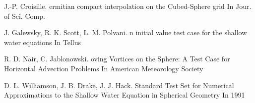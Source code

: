 \documentclass[portrait,final,a0paper,fontscale=0.277]{baposter}
\begin{document}
\begin{poster}
{\begin{thebibliography}{1}
        J.-P. Croisille.
        ermitian compact interpolation on the Cubed-Sphere grid
        \newblock In {Jour. of Sci. Comp.}
        
        J. Galewsky, R. K. Scott, L. M. Polvani.
        n initial value test case for the shallow water equations
        \newblock In {Tellus}
        
        R. D. Nair, C. Jablonowski.
        oving Vortices on the Sphere: A Test Case for Horizontal Advection Problems
        \newblock In {American Meteorology Society}
        
        D. L. Williamson, J. B. Drake, J. J. Hack.
         Standard Test Set for Numerical Approximations to the Shallow Water Equation in Spherical Geometry
        \newblock In {1991}
        
      \end{thebibliography}
   \vspace{0.3em}
  }
\end{poster}
\end{document}

